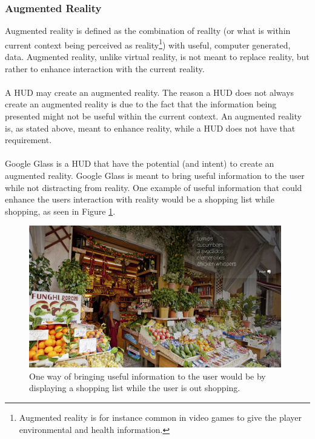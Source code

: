 \subsubsection{Augmented Reality}
\label{subsubsec:ar}
Augmented reality\cite{augmentedRealityDef} is defined as the combination of reallty (or what is within current context being perceived as reality\footnote{Augmented reality is for instance common in video games to give the player environmental and health information.}) with useful, computer generated, data. Augmented reality, unlike virtual reality, is not meant to replace reality, but rather to enhance interaction with the current reality.
\\
\\
A HUD may create an augmented reality. The reason a HUD does not always create an augmented reality is due to the fact that the information being presented might not be useful within the current context. An augmented reality is, as stated above, meant to enhance reality, while a HUD does not have that requirement.
\\
\\
Google Glass is a HUD that have the potential (and intent) to create an augmented reality. Google Glass is meant to bring useful information to the user while not distracting from reality. One example of useful information that could enhance the users interaction with reality would be a shopping list while shopping, as seen in Figure \ref{GlassShopping}.
\\
	\begin{figure}[ht!]
		\centering
		\includegraphics[width=110mm]{images/GoogleGlassKeepRevelant}
		\caption{One way of bringing useful information to the user would be by displaying a shopping list while the user is out shopping.\cite{glassDesignPrinciples}}
		\label{GlassShopping}
	\end{figure}
	
	


